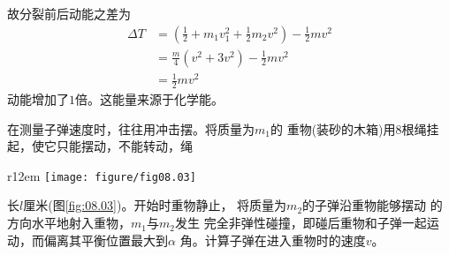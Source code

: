 \documentclass[../outline-of-mechanics.tex]{subfiles}
\begin{document}
故分裂前后动能之差为
\begin{equation*}
  \begin{split}
    \Delta T &= \left( \frac { 1 } { 2 } + m _ { 1 } v _ { 1 } ^ { 2 } + \frac { 1 } { 2 } m _ { 2 } v ^ { 2 } \right) - \frac { 1 } { 2 } m v ^ { 2 } \\
    &= \frac { m } { 4 } \left( v ^ { 2 } + 3 v ^ { 2 } \right) - \frac { 1 } { 2 } m v ^ { 2 } \\
    &= \frac { 1 } { 2 } m v ^ { 2 }
  \end{split}
\end{equation*}
动能增加了$ 1 $倍。这能量来源于化学能。

\example 在测量子弹速度时，往往用冲击摆。将质量为$ m _ 1 $的
重物(装砂的木箱)用$ 8 $根绳挂起，使它只能摆动，不能转动，绳
\begin{wrapfigure}[7]{r}{12em}
  \centering
  \texttt{[image: figure/fig08.03]}
  \caption{}
  \label{fig:08.03}
\end{wrapfigure}
长$ l $厘米(图\ref{fig:08.03})。开始时重物静止，
将质量为$ m _ 2 $的子弹沿重物能够摆动
的方向水平地射入重物，$ m _ 1 $与$ m _ 2 $发生
完全非弹性碰撞，即碰后重物和子弹一起运动，而偏离其平衡位置最大到$ \alpha $
角。计算子弹在进入重物时的速度$ v $。
\end{document}
